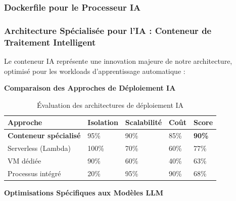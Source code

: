 \documentclass[12pt,a4paper]{report}
\begin{document}
\subsubsection{Dockerfile pour le Processeur IA}

\subsubsection{Architecture Spécialisée pour l'IA : Conteneur de Traitement Intelligent}

Le conteneur IA représente une innovation majeure de notre architecture, optimisé pour les workloads d'apprentissage automatique :

\textbf{Comparaison des Approches de Déploiement IA}

\begin{table}[H]
    \centering
    \begin{tabularx}{\textwidth}{|X|X|X|X|X|}
        \hline
        \textbf{Approche} & \textbf{Isolation} & \textbf{Scalabilité} & \textbf{Coût} & \textbf{Score} \\
        \hline
        \textbf{Conteneur spécialisé} & 95\% & 90\% & 85\% & \textbf{90\%} \\
        \hline
        Serverless (Lambda) & 100\% & 70\% & 60\% & 77\% \\
        \hline
        VM dédiée & 90\% & 60\% & 40\% & 63\% \\
        \hline
        Processus intégré & 20\% & 95\% & 90\% & 68\% \\
        \hline
    \end{tabularx}
    \caption{Évaluation des architectures de déploiement IA}
\end{table}

\textbf{Optimisations Spécifiques aux Modèles LLM}
\end{document}
